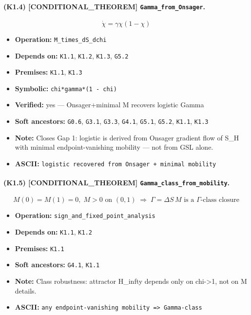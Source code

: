 \documentclass[11pt,a4paper]{article}
\theoremstyle{remark}\newtheorem*{caution}{Caution}
\newcommand{\tagbox}[1]{\textsc{[#1]}}
\begin{document}
\paragraph{(K1.4) \tagbox{CONDITIONAL\_THEOREM} \texttt{Gamma\_from\_Onsager}.}
\begin{equation}
\dot\chi=\gamma\chi(1-\chi)
\tag{K1.4}
\end{equation}
\begin{itemize}\setlength{\itemsep}{0.12em}
\item \textbf{Operation:} \texttt{M\_times\_dS\_dchi}
\item \textbf{Depends on:} \texttt{K1.1}, \texttt{K1.2}, \texttt{K1.3}, \texttt{G5.2}
\item \textbf{Premises:} \texttt{K1.1}, \texttt{K1.3}
\item \textbf{Symbolic:} \texttt{chi*gamma*(1 - chi)}
\item \textbf{Verified:} yes --- Onsager+minimal M recovers logistic Gamma
\item \textbf{Soft ancestors:} \texttt{G0.6}, \texttt{G3.1}, \texttt{G3.3}, \texttt{G4.1}, \texttt{G5.1}, \texttt{G5.2}, \texttt{K1.1}, \texttt{K1.3}
\item \textbf{Note:} Closes Gap 1: logistic is derived from Onsager gradient flow of S\_H with minimal endpoint-vanishing mobility — not from GSL alone.
\item \textbf{ASCII:} \texttt{logistic recovered from Onsager + minimal mobility}
\end{itemize}
\paragraph{(K1.5) \tagbox{CONDITIONAL\_THEOREM} \texttt{Gamma\_class\_from\_mobility}.}
\begin{equation}
M(0)=M(1)=0,\;M>0\text{ on }(0,1)\;\Rightarrow\;\Gamma=\Delta S\,M\text{ is a }\Gamma\text{-class closure}
\tag{K1.5}
\end{equation}
\begin{itemize}\setlength{\itemsep}{0.12em}
\item \textbf{Operation:} \texttt{sign\_and\_fixed\_point\_analysis}
\item \textbf{Depends on:} \texttt{K1.1}, \texttt{K1.2}
\item \textbf{Premises:} \texttt{K1.1}
\item \textbf{Soft ancestors:} \texttt{G4.1}, \texttt{K1.1}
\item \textbf{Note:} Class robustness: attractor H\_infty depends only on chi->1, not on M details.
\item \textbf{ASCII:} \texttt{any endpoint-vanishing mobility => Gamma-class}
\end{itemize}
\end{document}
